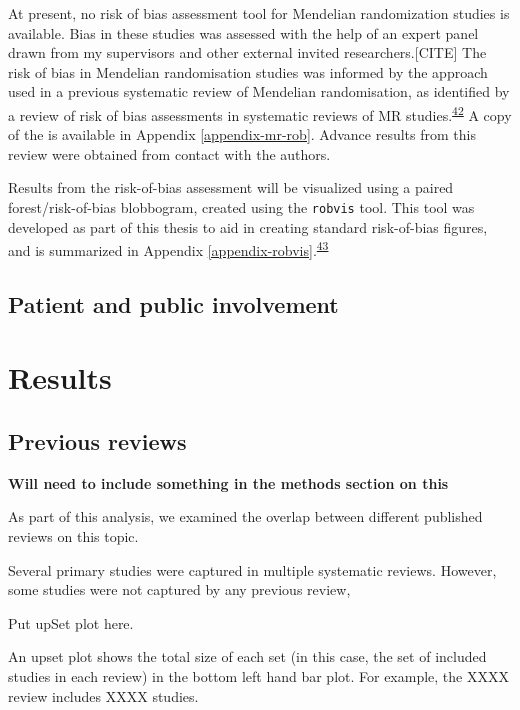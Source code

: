 \documentclass[a4paper, twoside]{templates/ociamthesis}
\begin{document}
At present, no risk of bias assessment tool for Mendelian randomization studies is available. Bias in these studies was assessed with the help of an expert panel drawn from my supervisors and other external invited researchers.{[}CITE{]} The risk of bias in Mendelian randomisation studies was informed by the approach used in a previous systematic review of Mendelian randomisation, as identified by a review of risk of bias assessments in systematic reviews of MR studies.\textsuperscript{\protect\hyperlink{ref-mamluk2020}{42}} A copy of the is available in Appendix \ref{appendix-mr-rob}. Advance results from this review were obtained from contact with the authors.

Results from the risk-of-bias assessment will be visualized using a paired forest/risk-of-bias blobbogram, created using the \texttt{robvis} tool. This tool was developed as part of this thesis to aid in creating standard risk-of-bias figures, and is summarized in Appendix \ref{appendix-robvis}.\textsuperscript{\protect\hyperlink{ref-mcguinness2019}{43}}

\hypertarget{patient-and-public-involvement}{%
\subsection{Patient and public involvement}\label{patient-and-public-involvement}}

\hypertarget{results}{%
\section{Results}\label{results}}

\hypertarget{previous-reviews}{%
\subsection{Previous reviews}\label{previous-reviews}}

\textbf{Will need to include something in the methods section on this}

As part of this analysis, we examined the overlap between different published reviews on this topic.

Several primary studies were captured in multiple systematic reviews. However, some studies were not captured by any previous review,

Put upSet plot here.

An upset plot shows the total size of each set (in this case, the set of included studies in each review) in the bottom left hand bar plot. For example, the XXXX review includes XXXX studies.
\end{document}

